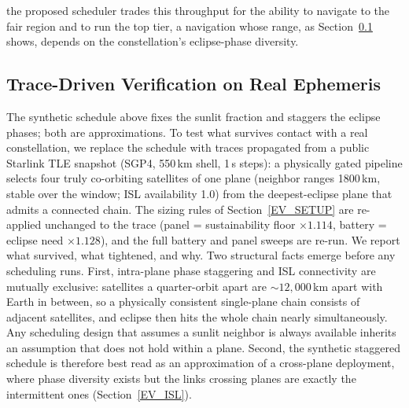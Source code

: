 the proposed scheduler trades this throughput for the ability to navigate to
the fair region and to run the top tier, a navigation whose range, as
Section~\ref{EV_TLE} shows, depends on the constellation's eclipse-phase
diversity.

\subsection{Trace-Driven Verification on Real Ephemeris}\label{EV_TLE}
The synthetic schedule above fixes the sunlit fraction and staggers the eclipse
phases; both are approximations. To test what survives contact with a real
constellation, we replace the schedule with traces propagated from a public
Starlink TLE snapshot (SGP4, 550\,km shell, 1\,s steps): a physically gated
pipeline selects four truly co-orbiting satellites of one plane (neighbor
ranges 1800\,km, stable over the window; ISL availability 1.0) from the
deepest-eclipse plane that admits a connected chain. The sizing rules of
Section~\ref{EV_SETUP} are re-applied unchanged to the trace (panel =
sustainability floor $\times1.114$, battery = eclipse need $\times1.128$), and
the full battery and panel sweeps are re-run. We report what survived, what
tightened, and why. Two structural facts emerge before any scheduling runs.
First, intra-plane phase staggering and ISL connectivity are mutually
exclusive: satellites a quarter-orbit apart are ${\sim}12{,}000$\,km apart with
Earth in between, so a physically consistent single-plane chain consists of
adjacent satellites, and eclipse then hits the whole chain nearly
simultaneously. Any scheduling design that assumes a sunlit neighbor is always
available inherits an assumption that does not hold within a plane. Second, the
synthetic staggered schedule is therefore best read as an approximation of a
cross-plane deployment, where phase diversity exists but the links crossing
planes are exactly the intermittent ones (Section~\ref{EV_ISL}).

